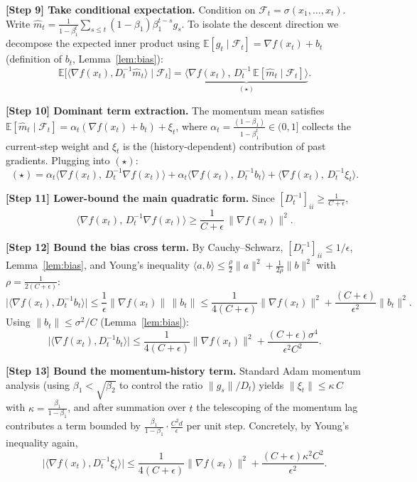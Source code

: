 \documentclass[11pt]{article}
\begin{document}
\textbf{[Step 9] Take conditional expectation.}
Condition on $\mathcal F_t = \sigma(x_1,\dots,x_t)$. Write
$\hat m_t = \frac{1}{1-\beta_1^t}\sum_{s\le t}(1-\beta_1)\beta_1^{t-s} g_s$. To isolate the
descent direction we decompose the expected inner product using
$\mathbb{E}[g_t\mid\mathcal F_t]=\nabla f(x_t)+b_t$ (definition of $b_t$, Lemma~\ref{lem:bias}):
\[
\mathbb{E}\big[\langle \nabla f(x_t), D_t^{-1}\hat m_t\rangle\mid\mathcal F_t\big]
= \underbrace{\big\langle \nabla f(x_t),\, D_t^{-1}\,\mathbb{E}[\hat m_t\mid\mathcal F_t]\big\rangle}_{(\star)} .
\]

\textbf{[Step 10] Dominant term extraction.}
The momentum mean satisfies
$\mathbb{E}[\hat m_t\mid\mathcal F_t] = \alpha_t(\nabla f(x_t)+b_t) + \xi_t$,
where $\alpha_t=\frac{(1-\beta_1)}{1-\beta_1^t}\in(0,1]$ collects the current-step weight and
$\xi_t$ is the (history-dependent) contribution of past gradients. Plugging into $(\star)$:
\[
(\star) = \alpha_t\big\langle \nabla f(x_t),\, D_t^{-1}\nabla f(x_t)\big\rangle
        + \alpha_t\big\langle \nabla f(x_t),\, D_t^{-1} b_t\big\rangle
        + \big\langle \nabla f(x_t),\, D_t^{-1}\xi_t\big\rangle.
\]

\textbf{[Step 11] Lower-bound the main quadratic form.}
Since $[D_t^{-1}]_{ii}\ge \frac{1}{C+\epsilon}$,
\[
\big\langle \nabla f(x_t),\, D_t^{-1}\nabla f(x_t)\big\rangle
\ge \frac{1}{C+\epsilon}\,\|\nabla f(x_t)\|^2 .
\]

\textbf{[Step 12] Bound the bias cross term.}
By Cauchy--Schwarz, $[D_t^{-1}]_{ii}\le 1/\epsilon$, Lemma~\ref{lem:bias}, and Young's
inequality $\langle a,b\rangle\le \frac{\rho}{2}\|a\|^2+\frac{1}{2\rho}\|b\|^2$ with
$\rho=\frac{1}{2(C+\epsilon)}$:
\[
\big|\langle \nabla f(x_t), D_t^{-1} b_t\rangle\big|
\le \frac{1}{\epsilon}\|\nabla f(x_t)\|\,\|b_t\|
\le \frac{1}{4(C+\epsilon)}\|\nabla f(x_t)\|^2 + \frac{(C+\epsilon)}{\epsilon^2}\|b_t\|^2 .
\]
Using $\|b_t\|\le \sigma^2/C$ (Lemma~\ref{lem:bias}):
\[
\big|\langle \nabla f(x_t), D_t^{-1} b_t\rangle\big|
\le \frac{1}{4(C+\epsilon)}\|\nabla f(x_t)\|^2 + \frac{(C+\epsilon)\sigma^4}{\epsilon^2 C^2}.
\]

\textbf{[Step 13] Bound the momentum-history term.}
Standard Adam momentum analysis (using $\beta_1<\sqrt{\beta_2}$ to control the
ratio $\|g_s\|/D_t$) yields $\|\xi_t\|\le \kappa\, C$ with
$\kappa = \frac{\beta_1}{1-\beta_1}$, and after summation over $t$ the telescoping of the
momentum lag contributes a term bounded by $\frac{\beta_1}{1-\beta_1}\cdot\frac{C^2 d}{\epsilon}$
per unit step. Concretely, by Young's inequality again,
\[
\big|\langle \nabla f(x_t), D_t^{-1}\xi_t\rangle\big|
\le \frac{1}{4(C+\epsilon)}\|\nabla f(x_t)\|^2
+ \frac{(C+\epsilon)\kappa^2 C^2}{\epsilon^2}.
\]
\end{document}
